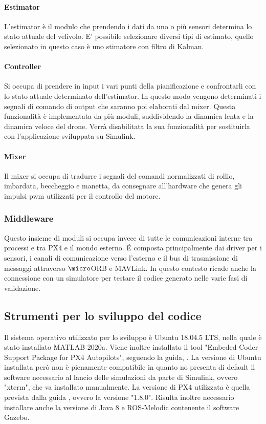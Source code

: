 \paragraph{Estimator}
L'estimator è il modulo che prendendo i dati da uno o più sensori determina lo stato attuale del velivolo. E' possibile selezionare diversi tipi di estimato, quello selezionato in questo caso è uno stimatore con filtro di Kalman.
\paragraph{Controller}
Si occupa di prendere in input i vari punti della pianificazione e confrontarli con lo stato attuale determinato dell'estimator. In questo modo vengono determinati i segnali di comando di output che saranno poi elaborati dal mixer. Questa funzionalità è implementata da più moduli, suddividendo la dinamica lenta e la dinamica veloce del drone. Verrà disabilitata la sua funzionalità per sostituirla con l'applicazione sviluppata su Simulink.
\paragraph{Mixer}
Il mixer si occupa di tradurre i segnali del comandi normalizzati di rollio, imbardata, beccheggio e manetta, da consegnare all'hardware che genera gli impulsi pwm utilizzati per il controllo del motore.
\subsubsection{Middleware}
Questo insieme di moduli si occupa invece di tutte le comunicazioni interne tra processi e tra PX4 e il mondo esterno. \'E composta principalmente dai driver per i sensori, i canali di comunicazione verso l'esterno e il bus di trasmissione di messaggi attraverso $\micro$ORB e MAVLink. In questo contesto ricade anche  la connessione con un simulatore per testare il codice generato nelle varie fasi di validazione.
\subsection{Strumenti per lo sviluppo del codice}
Il sistema operativo utilizzato per lo sviluppo è Ubuntu 18.04.5 LTS, nella quale è stato installato MATLAB 2020a. Viene inoltre installato il tool "Embeded Coder Support Package for PX4 Autopilots", seguendo la guida, \cite{PX4MATLAB}. La versione di Ubuntu  installata però non è pienamente compatibile in quanto no presenta di default il software necessario al lancio delle simulazioni da parte di Simulink, ovvero "xterm", che va installato manualmente. La versione di PX4 utilizzata è quella prevista dalla guida \cite{PX4MATLAB}, ovvero la versione "1.8.0". Risulta inoltre necessario installare anche la versione di Java 8 e ROS-Melodic contenente il software Gazebo.

